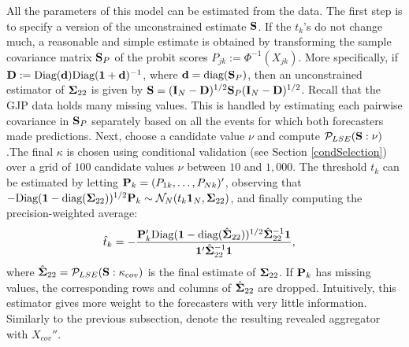 \documentclass[11pt]{article}
\newcommand{\PP}{{\bf P}}
\renewcommand{\P}{\mathbb{P}}
\theoremstyle{definition}
\theoremstyle{definition}
\def\one{{\bf 1}}
\def\bSigma{{\bf \Sigma}}
\def\dd{{\bf d}}
\def\D{{\bf D}}
\def\SS{{\bf S}}
\def\I{{\bf I}}
\def\P{{\mathbb P}}
\def\Cov{{\rm Cov}\,}
\def\diag{\text{diag}}
\def\Diag{\text{Diag}}
\def\diag{\text{diag}}
\begin{document}


All the parameters of this model can be estimated from the data. The first step is to specify a version of the  unconstrained estimate $\SS$. If the $t_k$'s do not change much, a reasonable and simple estimate is obtained  by transforming the sample covariance matrix  $\SS_P$ of the probit scores $P_{jk} := \Phi^{-1}(X_{jk})$. More specifically,  if $\D := \Diag( \dd ) \Diag(\one + \dd)^{-1}$, where $\dd = \diag(\SS_P)$, then an unconstrained estimator of $\bSigma_{22}$ is given by $\SS = (\I_N-\D)^{1/2} \SS_P (\I_N-\D)^{1/2}$. Recall that the GJP data holds many missing values. This is handled by estimating each pairwise covariance in $\SS_P$ separately based on all the events for which both forecasters made predictions. 
Next, choose a candidate value $\nu$ and compute $\mathcal{P}_{LSE}(\SS : \nu)$.The final $\kappa$ is chosen using conditional validation (see Section \ref{condSelection}) over a grid of $100$ candidate values $\nu$ between $10$ and $1,000$. 
The threshold $t_k$ can be estimated by letting $\PP_k = (P_{1k}, \dots, P_{Nk})'$, observing that $-\Diag(\one-\diag(\bSigma_{22}))^{1/2}\PP_{k} \sim \mathcal{N}_N(t_k \one_N, \bSigma_{22})$,
% 
and finally computing the precision-weighted average: 
\begin{align*}
\hat{t}_k &= -\frac{\PP_{k}' \Diag(\one-\diag(\hat{\bSigma}_{22}))^{1/2} \hat{\bSigma}_{22}^{-1} \one}{\one' \hat{\bSigma}_{22}^{-1} \one},
\end{align*}
where $\hat{\bSigma}_{22} = \mathcal{P}_{LSE}(\SS : \kappa_{cov})$ is the final estimate of $\bSigma_{22}$. If $\PP_k$ has missing values, the corresponding rows and columns of $\hat{\bSigma}_{22}$ are dropped. Intuitively, this estimator gives more weight to the forecasters with very little information. Similarly to the previous subsection, denote the resulting revealed aggregator with $X_{cov}''$. 
\end{document}
